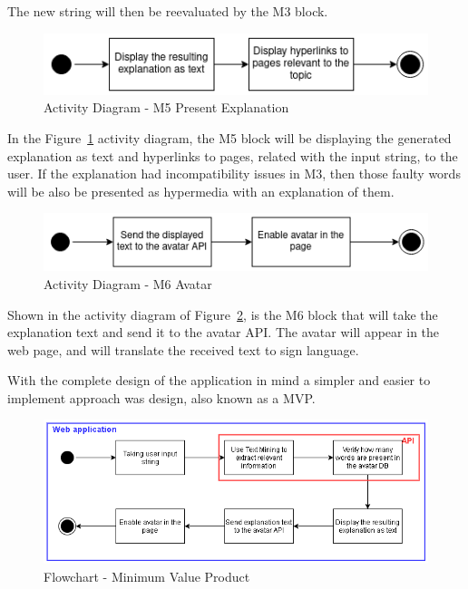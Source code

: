 The new string will then be reevaluated by the M3 block.

\begin{figure}[H]
\centering
\includegraphics[width=\textwidth,keepaspectratio]{ch4/assets/M5.png}
\caption[Activity Diagram Present Explanation Module]{Activity Diagram - M5 Present Explanation}
\label{fig:M5}
\end{figure}

In the Figure~\ref{fig:M5} activity diagram, the M5 block will be displaying the generated explanation as text and hyperlinks to pages, related with the input string, to the user.
If the explanation had incompatibility issues in M3, then those faulty words will be also be presented as hypermedia with an explanation of them.

\begin{figure}[H]
\centering
\includegraphics[width=\textwidth,keepaspectratio]{ch4/assets/M6.png}
\caption[Activity Diagram Avatar Module]{Activity Diagram - M6 Avatar}
\label{fig:M6}
\end{figure}

Shown in the activity diagram of Figure~\ref{fig:M6}, is the M6 block that will take the explanation text and send it to the avatar \gls{API}.
The avatar will appear in the web page, and will translate the received text to sign language.

With the complete design of the application in mind a simpler and easier to implement approach was design, also known as a \gls{MVP}.

\begin{figure}[H]
\centering
\includegraphics[width=\textwidth,keepaspectratio]{ch4/assets/mvp_2.png}
\caption[Flowchart Minimun Value Product]{Flowchart - Minimum Value Product}
\label{fig:mvp}
\end{figure}

